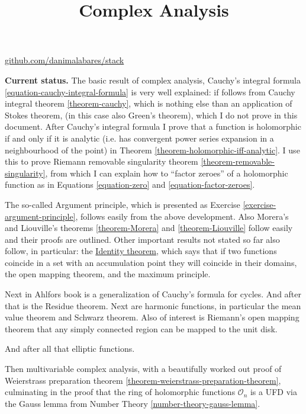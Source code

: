 



\title{Complex Analysis}
\maketitle

\label{section-phantom}
\hfill
\href{http://github.com/danimalabares/stack}{github.com/danimalabares/stack}

\tableofcontents

\medskip\noindent
{\bf Current status.}
The basic result of complex analysis,
Cauchy's integral formula \ref{equation-cauchy-integral-formula}
is very well explained:
if follows from Cauchy integral theorem \ref{theorem-cauchy},
which is nothing else than an application of Stokes theorem,
(in this case also Green's theorem),
which I do not prove in this document.
After Cauchy's integral formula
I prove that a function is holomorphic
if and only if it is analytic (i.e. has convergent
power series expansion in a neighbourhood of the point)
in Theorem \ref{theorem-holomorphic-iff-analytic}.
I use this to prove Riemann removable singularity theorem
\ref{theorem-removable-singularity},
from which I can explain how to ``factor zeroes'' of a 
holomorphic function as in Equations \ref{equation-zero}
and \ref{equation-factor-zeroes}.

The so-called Argument principle,
which is presented as Exercise \ref{exercise-argument-principle},
follows easily from the above development.
Also Morera's and Liouville's 
theorems \ref{theorem-Morera} and \ref{theorem-Liouville} follow easily
and their proofs are outlined.
Other important results not stated so far also follow,
in particular: the \href{https://en.wikipedia.org/wiki/Identity_theorem}{
Identity theorem},
which says that if two functions coincide in a 
set with an accumulation point they will coincide in their domains,
the open mapping theorem, and the maximum principle.

Next in Ahlfors book is a generalization of Cauchy's formula
for cycles. And after that is the Residue theorem.
Next are harmonic functions, in particular
the mean value theorem and Schwarz theorem.
Also of interest is Riemann's open mapping theorem
that any simply connected region can be mapped to the
unit disk.

And after all that elliptic functions.

\medskip\noindent
Then multivariable complex analysis,
with a beautifully worked out proof of Weierstrass preparation theorem
\ref{theorem-weierstrass-preparation-theorem},
culminating in the proof that the ring of holomorphic
functions $\mathcal{O}_n$ is a UFD via the Gauss lemma
from Number Theory \ref{number-theory-gauss-lemma}.

